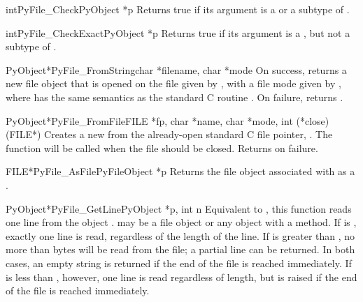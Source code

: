 \begin{cfuncdesc}{int}{PyFile_Check}{PyObject *p}
  Returns true if its argument is a  or a subtype
  of .
\end{cfuncdesc}

\begin{cfuncdesc}{int}{PyFile_CheckExact}{PyObject *p}
  Returns true if its argument is a , but not a
  subtype of .
\end{cfuncdesc}

\begin{cfuncdesc}{PyObject*}{PyFile_FromString}{char *filename, char *mode}
  On success, returns a new file object that is opened on the file
  given by , with a file mode given by , where
   has the same semantics as the standard C routine
  .  On failure, returns \NULL{}.
\end{cfuncdesc}

\begin{cfuncdesc}{PyObject*}{PyFile_FromFile}{FILE *fp,
                                              char *name, char *mode,
                                              int (*close)(FILE*)}
  Creates a new  from the already-open standard C
  file pointer, .  The function  will be called
  when the file should be closed.  Returns \NULL{} on failure.
\end{cfuncdesc}

\begin{cfuncdesc}{FILE*}{PyFile_AsFile}{PyFileObject *p}
  Returns the file object associated with  as a .
\end{cfuncdesc}

\begin{cfuncdesc}{PyObject*}{PyFile_GetLine}{PyObject *p, int n}
  Equivalent to , this
  function reads one line from the object .   may be a
  file object or any object with a  method.  If
   is , exactly one line is read, regardless of the
  length of the line.  If  is greater than , no more
  than  bytes will be read from the file; a partial line can be
  returned.  In both cases, an empty string is returned if the end of
  the file is reached immediately.  If  is less than ,
  however, one line is read regardless of length, but
   is raised if the end of the file is reached
  immediately.
\end{cfuncdesc}

